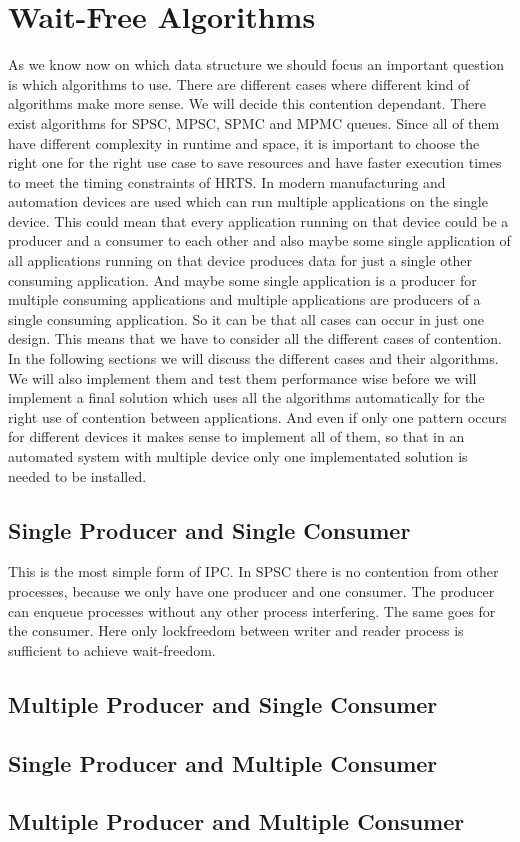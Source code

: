\section{Wait-Free Algorithms}\label{sec:wait-free-alg}
As we know now on which data structure we should focus an important question is which algorithms to use. There are different cases where different kind of algorithms make more sense. We will decide this contention dependant. There exist algorithms for \ac{SPSC}, \ac{MPSC}, \ac{SPMC} and \ac{MPMC} queues. Since all of them have different complexity in runtime and space, it is important to choose the right one for the right use case to save resources and have faster execution times to meet the timing constraints of \ac{HRTS}. In modern manufacturing and automation devices are used which can run multiple applications on the single device. This could mean that every application running on that device could be a producer and a consumer to each other and also maybe some single application of all applications running on that device produces data for just a single other consuming application. And maybe some single application is a producer for multiple consuming applications and multiple applications are producers of a single consuming application. So it can be that all cases can occur in just one design. This means that we have to consider all the different cases of contention. In the following sections we will discuss the different cases and their algorithms. We will also implement them and test them performance wise before we will implement a final solution which uses all the algorithms automatically for the right use of contention between applications. And even if only one pattern occurs for different devices it makes sense to implement all of them, so that in an automated system with multiple device only one implementated solution is needed to be installed.

\subsection{Single Producer and Single Consumer}\label{subsec:single-producer-and-single-consumer}
This is the most simple form of \ac{IPC}. In \ac{SPSC} there is no contention from other processes, because we only have one producer and one consumer. The producer can enqueue processes without any other process interfering. The same goes for the consumer. Here only lockfreedom between writer and reader process is sufficient to achieve wait-freedom.

\subsection{Multiple Producer and Single Consumer}\label{subsec:multiple-producer-and-single-consumer}

\subsection{Single Producer and Multiple Consumer}\label{subsec:single-producer-and-multiple-consumer}

\subsection{Multiple Producer and Multiple Consumer}\label{subsec:multiple-producer-and-multiple-consumer}